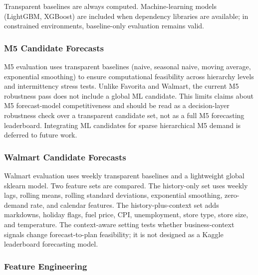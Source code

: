Transparent baselines are always computed. Machine-learning models (LightGBM, XGBoost) are included when dependency libraries are available; in constrained environments, baseline-only evaluation remains valid.

\subsubsection{M5 Candidate Forecasts}

M5 evaluation uses transparent baselines (naive, seasonal naive, moving average, exponential smoothing) to ensure computational feasibility across hierarchy levels and intermittency stress tests. Unlike Favorita and Walmart, the current M5 robustness pass does not include a global ML candidate. This limits claims about M5 forecast-model competitiveness and should be read as a decision-layer robustness check over a transparent candidate set, not as a full M5 forecasting leaderboard. Integrating ML candidates for sparse hierarchical M5 demand is deferred to future work.

\subsubsection{Walmart Candidate Forecasts}

Walmart evaluation uses weekly transparent baselines and a lightweight global sklearn model. Two feature sets are compared. The history-only set uses weekly lags, rolling means, rolling standard deviations, exponential smoothing, zero-demand rate, and calendar features. The history-plus-context set adds markdowns, holiday flags, fuel price, CPI, unemployment, store type, store size, and temperature. The context-aware setting tests whether business-context signals change forecast-to-plan feasibility; it is not designed as a Kaggle leaderboard forecasting model.

\subsubsection{Feature Engineering}

